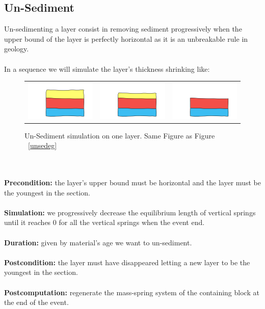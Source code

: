 \documentclass[12pt, a4paper]{report} %
\begin{document}
\subsection{Un-Sediment}
\label{sub:unsed}
Un-sedimenting a layer consist in removing sediment progressively when the upper bound of the layer is perfectly horizontal as it is an unbreakable rule in geology.\\\\

In a sequence we will simulate the layer's thickness shrinking like:
\begin{figure}[H]
\centering
\begin{tabular}{@{}ccc@{}}
\includegraphics[width=.35\textwidth]{unSedimentDescription0.png}&
\includegraphics[width=.35\textwidth]{unSedimentDescription1.png}&
\includegraphics[width=.35\textwidth]{unSedimentDescription2.png}\\
\end{tabular}
\caption{Un-Sediment simulation on one layer. Same Figure as Figure ~\ref{unsedeg}}
\label{unsedeg2}
\end{figure}\\\\
\textbf{Precondition:} the layer's upper bound must be horizontal and the layer must be the youngest in the section.\\\\
\textbf{Simulation:} we progressively decrease the equilibrium length of vertical springs until it reaches $0$ for all the vertical springs when the event end.\\\\
\textbf{Duration:} given by material's age we want to un-sediment.\\\\
\textbf{Postcondition:} the layer must have disappeared letting a new layer to be the youngest 
in the section.\\\\
\textbf{Postcomputation:} regenerate the mass-spring system of the containing block at the end of the event.\\\\
\end{document}
